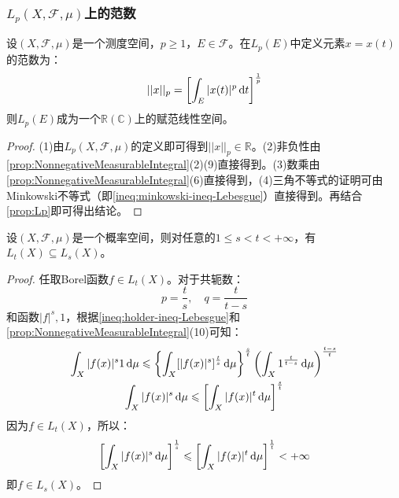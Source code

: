 \subsubsection{$L_p(X,\mathscr{F},\mu)$上的范数}
\begin{definition}
	设$(X,\mathscr{F},\mu)$是一个测度空间，$p\geqslant1$，$E\in\mathscr{F}$。在$L_p(E)$中定义元素$x=x(t)$的范数为：
	\begin{equation*}
		||x||_p=\left[\int_{E}|x(t)|^p\mathop{}\!\mathrm{d} t\right]^\frac{1}{p}
	\end{equation*}
	则$L_p(E)$成为一个$\mathbb{R}(\mathbb{C})$上的赋范线性空间。
\end{definition}
\begin{proof}
	(1)由$L_p(X,\mathscr{F},\mu)$的定义即可得到$||x||_p\in\mathbb{R}$。(2)非负性由\cref{prop:NonnegativeMeasurableIntegral}(2)(9)直接得到。(3)数乘由\cref{prop:NonnegativeMeasurableIntegral}(6)直接得到，(4)三角不等式的证明可由Minkowski不等式（即\cref{ineq:minkowski-ineq-Lebesgue}）直接得到。再结合\cref{prop:Lp}即可得出结论。
\end{proof}

\begin{theorem}\label{theo:LtLs}
	设$(X,\mathscr{F},\mu)$是一个概率空间，则对任意的$1\leqslant s<t<+\infty$，有$L_t(X)\subseteq L_s(X)$。
\end{theorem}
\begin{proof}
	任取Borel函数$f\in L_t(X)$。对于共轭数：
	\begin{equation*}
		p=\frac{t}{s},\quad q=\frac{t}{t-s}
	\end{equation*}
	和函数$|f|^s,1$，根据\cref{ineq:holder-ineq-Lebesgue}和\cref{prop:NonnegativeMeasurableIntegral}(10)可知：
	\begin{gather*}
		\int_{X}|f(x)|^s1\mathop{}\!\mathrm{d}\mu\leqslant\left\{\int_{X}[|f(x)|^s]^{\frac{t}{s}}\mathop{}\!\mathrm{d}\mu\right\}^{\frac{s}{t}}\left(\int_{X}1^{\frac{t}{t-s}}\mathop{}\!\mathrm{d}\mu\right)^{\frac{t-s}{t}} \\
		\int_{X}|f(x)|^s\mathop{}\!\mathrm{d}\mu\leqslant\left[\int_{X}|f(x)|^t\mathop{}\!\mathrm{d}\mu\right]^{\frac{s}{t}}
	\end{gather*}
	因为$f\in L_t(X)$，所以：
	\begin{equation*}
		\left[\int_{X}|f(x)|^s\mathop{}\!\mathrm{d}\mu\right]^{\frac{1}{s}}\leqslant\left[\int_{X}|f(x)|^t\mathop{}\!\mathrm{d}\mu\right]^{\frac{1}{t}}<+\infty
	\end{equation*}
	即$f\in L_s(X)$。
\end{proof}

